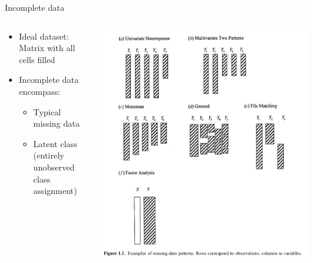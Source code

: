 \documentclass[dvipdfmx,bigger,aspectratio=169]{beamer}
\begin{document}
\begin{frame}[label={sec:orga64fe3d}]{Incomplete data}
\begin{columns}
\begin{column}{0.45\columnwidth}
\begin{itemize}
\item Ideal dataset: Matrix with all cells filled
\item Incomplete data encompass:
\begin{itemize}
\item Typical missing data
\item Latent class (entirely unobserved class assignment)
\end{itemize}
\end{itemize}
\end{column}

\begin{column}{0.45\columnwidth}
\begin{center}
\includegraphics[page=1,keepaspectratio,width=\textwidth,height=0.75\textheight]{./source/missing_patterns.png}
\end{center}
\scriptsize \cite{littleStatisticalAnalysisMissing2002} \normalsize
\end{column}
\end{columns}
\end{frame}
\end{document}
